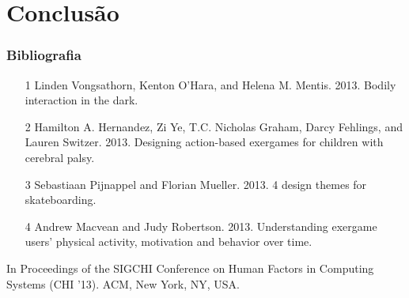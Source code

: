 \documentclass[brazil]{beamer}
\begin{document}
\section{Conclusão}
\begin{frame}
  \frametitle{Bibliografia}
  \begin{itemize}
    \footnotesize
    \item[1]
      Linden Vongsathorn, Kenton O'Hara, and Helena M. Mentis. 2013. Bodily interaction in the dark. 
    \vspace{1em}
    \item[2]
      Hamilton A. Hernandez, Zi Ye, T.C. Nicholas Graham, Darcy Fehlings, and Lauren Switzer. 2013. 
      Designing action-based exergames for children with cerebral palsy. 
    \vspace{1em}
    \item[3]
      Sebastiaan Pijnappel and Florian Mueller. 2013. 4 design themes for skateboarding. 
    \vspace{1em}
    \item[4]
      Andrew Macvean and Judy Robertson. 2013. Understanding exergame users' physical activity, motivation and behavior over time. 
  \end{itemize}
  In Proceedings of the SIGCHI Conference on Human Factors in Computing Systems (CHI '13). ACM, New York, NY, USA.
\end{frame}
\end{document}
